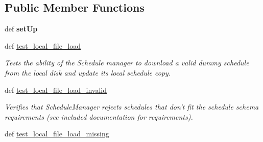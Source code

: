 \subsection*{Public Member Functions}
\begin{DoxyCompactItemize}
\item 
\hypertarget{classhwm_1_1sessions_1_1tests_1_1test__schedule_1_1_test_schedule_a53c04d1ce7982c94c18e193f5fae6de3}{def {\bfseries set\-Up}}\label{classhwm_1_1sessions_1_1tests_1_1test__schedule_1_1_test_schedule_a53c04d1ce7982c94c18e193f5fae6de3}

\item 
\hypertarget{classhwm_1_1sessions_1_1tests_1_1test__schedule_1_1_test_schedule_a81669427da2aaa2ff48f0d21c8925ee2}{def \hyperlink{classhwm_1_1sessions_1_1tests_1_1test__schedule_1_1_test_schedule_a81669427da2aaa2ff48f0d21c8925ee2}{test\-\_\-local\-\_\-file\-\_\-load}}\label{classhwm_1_1sessions_1_1tests_1_1test__schedule_1_1_test_schedule_a81669427da2aaa2ff48f0d21c8925ee2}

\begin{DoxyCompactList}\small\item\em Tests the ability of the Schedule manager to download a valid dummy schedule from the local disk and update its local schedule copy. \end{DoxyCompactList}\item 
\hypertarget{classhwm_1_1sessions_1_1tests_1_1test__schedule_1_1_test_schedule_a9c8bfe52c77701c5c941604a2a06f60f}{def \hyperlink{classhwm_1_1sessions_1_1tests_1_1test__schedule_1_1_test_schedule_a9c8bfe52c77701c5c941604a2a06f60f}{test\-\_\-local\-\_\-file\-\_\-load\-\_\-invalid}}\label{classhwm_1_1sessions_1_1tests_1_1test__schedule_1_1_test_schedule_a9c8bfe52c77701c5c941604a2a06f60f}

\begin{DoxyCompactList}\small\item\em Verifies that Schedule\-Manager rejects schedules that don't fit the schedule schema requirements (see included documentation for requirements). \end{DoxyCompactList}\item 
\hypertarget{classhwm_1_1sessions_1_1tests_1_1test__schedule_1_1_test_schedule_ae9a9f2dd3dbd2169a24bfc6210f5b238}{def \hyperlink{classhwm_1_1sessions_1_1tests_1_1test__schedule_1_1_test_schedule_ae9a9f2dd3dbd2169a24bfc6210f5b238}{test\-\_\-local\-\_\-file\-\_\-load\-\_\-missing}}\label{classhwm_1_1sessions_1_1tests_1_1test__schedule_1_1_test_schedule_ae9a9f2dd3dbd2169a24bfc6210f5b238}


\end{DoxyCompactItemize}
